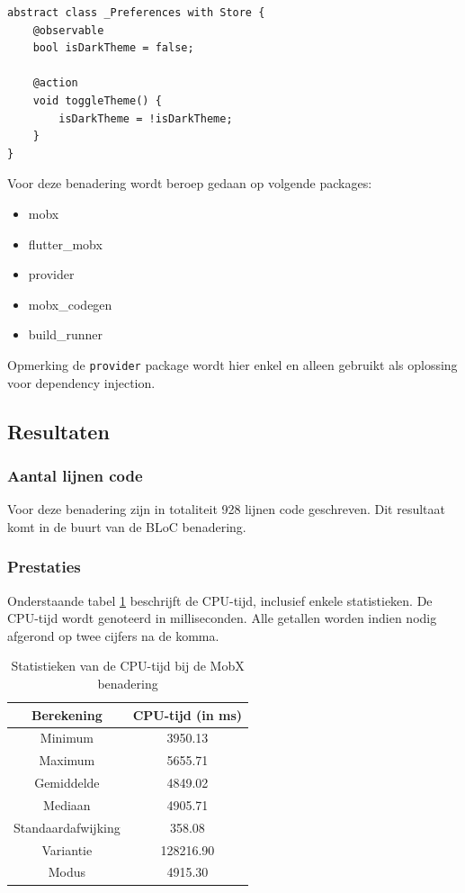 \begin{verbatim}
abstract class _Preferences with Store {
    @observable
    bool isDarkTheme = false;

    @action
    void toggleTheme() {
        isDarkTheme = !isDarkTheme;
    }
}
\end{verbatim}

Voor deze benadering wordt beroep gedaan op volgende packages: 
\begin{itemize}
    \item{mobx}
    \item{flutter\_mobx}
    \item{provider}
    \item{mobx\_codegen}
    \item{build\_runner}
\end{itemize}
Opmerking de \verb|provider| package wordt hier enkel en alleen gebruikt als oplossing voor dependency injection.

\subsection{Resultaten}
\subsubsection{Aantal lijnen code}
Voor deze benadering zijn in totaliteit 928 lijnen code geschreven. Dit resultaat komt in de buurt van de BLoC benadering.
\subsubsection{Prestaties}
Onderstaande tabel \ref{table:experiment-mobx-statistics} beschrijft de CPU-tijd, inclusief enkele statistieken. De CPU-tijd wordt genoteerd in milliseconden. Alle getallen worden indien nodig afgerond op twee cijfers na de komma.
\begin{table}[H]
    \centering
    \begin{tabular}{c|c}
        \textbf{Berekening} & \textbf{CPU-tijd (in ms)}  \\ \hline
        Minimum             & 3950.13                    \\ \hline
        Maximum             & 5655.71                    \\ \hline
        Gemiddelde          & 4849.02                    \\ \hline
        Mediaan             & 4905.71                    \\ \hline
        Standaardafwijking  & 358.08                     \\ \hline
        Variantie           & 128216.90                  \\ \hline
        Modus               & 4915.30                    \\                
    \end{tabular}
    \caption{Statistieken van de CPU-tijd bij de MobX benadering}
    \label{table:experiment-mobx-statistics}
\end{table}

